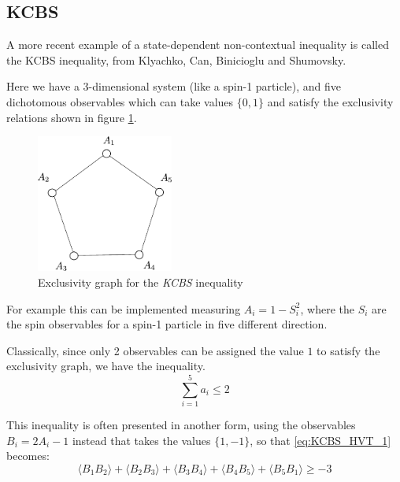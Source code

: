 \documentclass[a4paper]{article}
\newcommand{\acron}[1]{\textsc{#1}}
\theoremstyle{definition}
\begin{document}
\subsection{KCBS}
A more recent example of a state-dependent non-contextual inequality is
called the \acron{KCBS} inequality, from Klyachko, Can, Binicioglu and Shumovsky.

Here we have a 3-dimensional system (like a spin-1 particle), and five
dichotomous observables which can take values $\{0,1\}$ and satisfy the
exclusivity relations shown in figure \ref{fig:KCBS_graph}.
\begin{figure}[h]
        \centering
        \includegraphics[width=0.4\textwidth]{KCBSog.pdf}
        \caption{Exclusivity graph for the \emph{KCBS} inequality}
    \label{fig:KCBS_graph}
\end{figure}
For example this can be implemented measuring $A_i = 1 - S_i^2$,
where the $S_i$ are the spin observables for a spin-1 particle in five
different direction.

Classically, since only 2 observables can be assigned the value
$1$ to satisfy the exclusivity graph, we have the inequality.
\begin{equation}
    \sum_{i=1}^5 a_i \le 2
    \label{eq:KCBS_HVT_1}
\end{equation}

This inequality is often presented in another form, using the
observables $B_i = 2 A_i - 1$ instead that takes the values $\{1,-1\}$, so that
\eqref{eq:KCBS_HVT_1} becomes:
\begin{equation}
    \langle{B_1B_2}\rangle + 
    \langle{B_2B_3}\rangle + 
    \langle{B_3B_4}\rangle + 
    \langle{B_4B_5}\rangle + 
    \langle{B_5B_1}\rangle \ge - 3 
    \label{eq:KCBS_HVT_2}
\end{equation}
\end{document}
